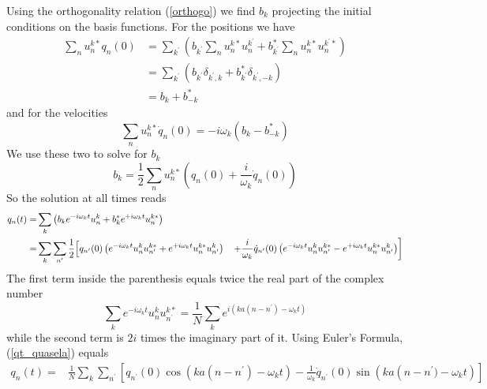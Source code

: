 Using the orthogonality relation (\ref{orthogo}) we find $b_k$ projecting the initial conditions on the basis functions. For the positions we have
\begin{equation}
\begin{aligned}
\sum_{n} u_{n}^{k *} q_{n}(0) &=\sum_{k^{\prime}}\left(b_{k^{\prime}} \sum_{n} u_{n}^{k *} u_{n}^{k^{\prime}}+b_{k^{\prime}}^{*} \sum_{n} u_{n}^{k *} u_{n}^{k^{\prime} *}\right) \\
&=\sum_{k^{\prime}}\left(b_{k^{\prime}} \delta_{k^{\prime}, k}+b_{k^{\prime}}^{*} \delta_{k^{\prime},-k}\right) \\
&=b_{k}+b_{-k}^{*}
\end{aligned}
\end{equation}
and for the velocities 
\begin{equation}
\sum_{n} u_{n}^{k *} \dot{q}_{n}(0)=-{i} \omega_{k}\left(b_{k}-b_{-k}^{*}\right)
\end{equation}
We use these two to solve for $b_k$ 
\begin{equation}
b_{k}=\frac{1}{2} \sum_{n} u_{n}^{k *}\left(q_{n}(0)+\frac{{i}}{\omega_{k}} \dot{q}_{n}(0)\right)
\label{coeff}
\end{equation}
So the solution at all times reads
\begin{equation}
\begin{aligned}
q_{n}(t)=& \sum_{k}\left(b_{k} {e}^{-{i} \omega_{k} t} u_{n}^{k}+b_{k}^{*} {e}^{+{i} \omega_{k} t} u_{n}^{k *}\right) \\
=& \sum_{k} \sum_{n^{\prime}} \frac{1}{2}\Big{[}q_{n^{\prime}}(0)\left({e}^{-{i} \omega_{k} t} u_{n}^{k} u_{n^{\prime}}^{k *}+{e}^{+{i} \omega_{k} t} u_{n}^{k *} u_{n^{\prime}}^{k}\right)
&\left.+\frac{{i}}{\omega_{k}} \dot{q}_{n^{\prime}}(0)\left({e}^{-{i} \omega_{k} t} u_{n}^{k} u_{n^{\prime}}^{k *}-{e}^{+{i} \omega_{k} t} u_{n}^{k *} u_{n^{\prime}}^{k}\right)\right]
\end{aligned}
\label{qt_quasela}
\end{equation}
The first term inside the parenthesis equals twice the real part of the complex number
\begin{equation}
\sum_{k} {e}^{-{i} \omega_{k} t} u_{n}^{k} u_{n^{\prime}}^{k *}=\frac{1}{N} \sum_{k} {e}^{{i}\left(k a\left(n-n^{\prime}\right)-\omega_{k} t\right)}
\end{equation}
while the second term is $2i$ times the imaginary part of it. Using Euler's Formula, (\ref{qt_quasela}) equals 
\begin{equation}\begin{aligned}
q_{n}(t)=& \frac{1}{N} \sum_{k} \sum_{n^{\prime}}\left[q_{n^{\prime}}(0) \cos \left(k a\left(n-n^{\prime}\right)-\omega_{k} t\right)
-\frac{1}{\omega_{k}} \dot{q}_{n^\prime}(0) \sin \left(k a\left(n-n^{\prime}\right.)-\omega_{k} t\right)\right]
\end{aligned}\end{equation}\\

